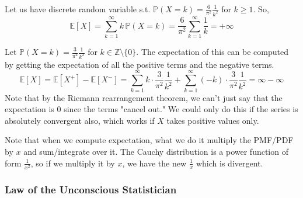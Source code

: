 \documentclass{article}
\begin{document}
    \begin{example}
      Let us have discrete random variable s.t. $\mathbb{P}(X = k) = \frac{6}{\pi^2} \frac{1}{k^2}$ for $k \geq 1$. So, 
      \begin{equation}
        \mathbb{E}[X] = \sum_{k=1}^\infty k \, \mathbb{P}(X = k) = \frac{6}{\pi^2} \sum_{k=1}^\infty \frac{1}{k} = +\infty
      \end{equation}
    \end{example}

    \begin{example}
      Let $\mathbb{P}(X = k) = \frac{3}{\pi^2} \frac{1}{k^2}$ for $k \in \mathbb{Z}\setminus \{0\}$. The expectation of this can be computed by getting the expectation of all the positive terms and the negative terms. 
      \begin{equation}
        \mathbb{E}[X] = \mathbb{E}[X^+] - \mathbb{E}[X^{-}] = \sum_{k=1}^\infty k \cdot \frac{3}{\pi^2} \frac{1}{k^2} + \sum_{k=1}^\infty (-k) \cdot \frac{3}{\pi^2} \frac{1}{k^2} = \infty - \infty
      \end{equation}
      Note that by the Riemann rearrangement theorem, we can't just say that the expectation is $0$ since the terms "cancel out." We could only do this if the series is absolutely convergent also, which works if $X$ takes positive values only. 
    \end{example}

    Note that when we compute expectation, what we do it multiply the PMF/PDF by $x$ and sum/integrate over it. The Cauchy distribution is a power function of form $\frac{1}{x^2}$, so if we multiply it by $x$, we have the new $\frac{1}{x}$ which is divergent. 

    \subsubsection{Law of the Unconscious Statistician}
\end{document}
